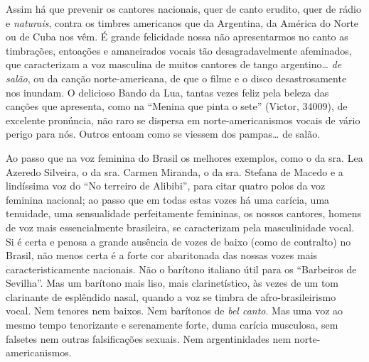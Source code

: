 Assim há que prevenir os cantores nacionais, quer de canto erudito, quer
de rádio e \textit{naturais}, contra os timbres americanos que da Argentina,
da América do Norte ou de Cuba nos vêm. É grande felicidade nossa não
apresentarmos no canto as timbrações, entoações e amaneirados vocais tão
desagradavelmente afeminados, que caracterizam a voz masculina de muitos
cantores de tango argentino\ldots{} \textit{de salão}, ou da canção
norte-americana, de que o filme e o disco desastrosamente nos inundam. O
delicioso Bando da Lua, tantas vezes feliz pela beleza das canções que
apresenta, como na ``Menina que pinta o sete'' (Victor, 34009), de
excelente pronúncia, não raro se dispersa em norte-americanismos vocais
de vário perigo para nós. Outros entoam como se viessem dos pampas\ldots{} de
salão.

Ao passo que na voz feminina do Brasil os melhores exemplos, como o da
sra.\,\,Lea Azeredo Silveira, o da sra.\,\,Carmen Miranda, o da sra.\,\,Stefana
de Macedo e a lindíssima voz do ``No terreiro de Alibibi'', para citar
quatro polos da voz feminina nacional; ao passo que em todas estas vozes
há uma carícia, uma tenuidade, uma sensualidade perfeitamente femininas,
os nossos cantores, homens de voz mais essencialmente brasileira, se
caracterizam pela masculinidade vocal. Si é certa e penosa a grande
ausência de vozes de baixo (como de contralto) no Brasil, não menos
certa é a forte cor abaritonada das nossas vozes mais
caracteristicamente nacionais. Não o barítono italiano útil para os
``Barbeiros de Sevilha''. Mas um barítono mais liso, mais
clarinetístico, às vezes de um tom clarinante de esplêndido nasal,
quando a voz se timbra de afro-brasileirismo vocal. Nem tenores nem
baixos. Nem barítonos de \textit{bel canto}. Mas uma voz ao mesmo tempo
tenorizante e serenamente forte, duma carícia musculosa, sem falsetes
nem outras falsificações sexuais. Nem argentinidades nem
norte-americanismos.

